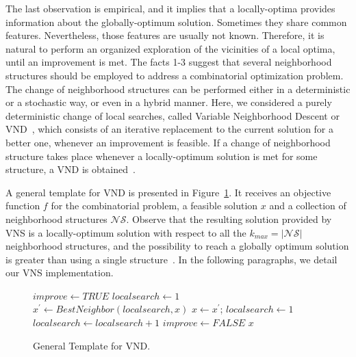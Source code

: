 The last observation is empirical, and it implies that a locally-optima provides information about the globally-optimum solution. Sometimes they share common features. Nevertheless, those features are usually not known. 
Therefore, it is natural to perform an organized exploration of the vicinities of a local optima, 
until an improvement is met. The facts 1-3 suggest that several neighborhood structures should be employed to 
address a combinatorial optimization problem. The change of neighborhood structures can be performed either in a  deterministic or a stochastic way, or even in a hybrid manner. Here, we considered a purely deterministic 
change of local searches, called Variable Neighborhood Descent or VND~\cite{16}, 
which consists of an iterative replacement to the current solution for a better one, whenever an improvement is feasible. If a change of neighborhood structure takes place whenever a locally-optimum solution is met for 
some structure, a VND is obtained~\cite{16}. 

A general template for VND is presented in Figure~\ref{vnd}.
It receives an objective function $f$ for the combinatorial problem, a feasible solution $x$ and 
 a collection of neighborhood structures $\mathcal{NS}$. Observe that the resulting solution provided by VNS is a locally-optimum solution with respect to all the $k_{max}=|\mathcal{NS}|$ neighborhood structures, and the possibility to reach a globally optimum solution is greater than using 
a single structure~\cite{16}. In the following paragraphs, we detail our VNS implementation. 



\begin{figure}[H]
\begin{algorithm}[H]
\caption{$x = VND(f,x,\mathcal{NS})$}
\begin{algorithmic}[1]
\STATE $improve \leftarrow TRUE$
\STATE $localsearch \leftarrow 1$
\STATE $x^{\prime} \leftarrow BestNeighbor(localsearch,x)$
\STATE $x \leftarrow x^{\prime}$; $localsearch \leftarrow 1$
\ELSE 
\STATE $localsearch \leftarrow localsearch + 1$
\ENDIF
{}
\STATE $improve \leftarrow FALSE$
\ENDIF
\ENDWHILE
\ENDWHILE
\RETURN $x$
\end{algorithmic}
\end{algorithm}
\caption{General Template for VND. \label{vnd}}
\end{figure}


